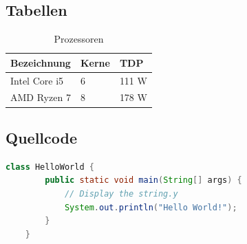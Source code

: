 \subsection{Tabellen}
\begin{table}[H]
    \centering
    \begin{tabular}[H]{l|l|l}
        Bezeichnung & Kerne & TDP \\
        \hline
        Intel Core i5 & 6 & 111 W \\
        \hline
        AMD Ryzen 7 & 8 & 178 W \\
    \end{tabular}
    \caption{Prozessoren}
\end{table}


\subsection{Quellcode}
\begin{lstlisting}[language=java, caption=Hello World in Java, captionpos=b]
    class HelloWorld {
        public static void main(String[] args) {
            // Display the string.y
            System.out.println("Hello World!");
        }
    }
\end{lstlisting}
